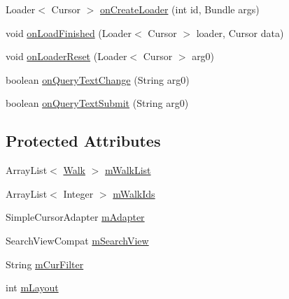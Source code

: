 \begin{DoxyCompactItemize}
\item 
Loader$<$ Cursor $>$ \hyperlink{classuk_1_1ac_1_1swan_1_1digitaltrails_1_1fragments_1_1_walk_list_fragment_aecc878e87887ae603b03326f08f838eb}{on\+Create\+Loader} (int id, Bundle args)
\item 
void \hyperlink{classuk_1_1ac_1_1swan_1_1digitaltrails_1_1fragments_1_1_walk_list_fragment_acecdf60308876436d77d84f87ab34bd2}{on\+Load\+Finished} (Loader$<$ Cursor $>$ loader, Cursor data)
\item 
void \hyperlink{classuk_1_1ac_1_1swan_1_1digitaltrails_1_1fragments_1_1_walk_list_fragment_a5ca7076480000e190fe35179c176120c}{on\+Loader\+Reset} (Loader$<$ Cursor $>$ arg0)
\item 
boolean \hyperlink{classuk_1_1ac_1_1swan_1_1digitaltrails_1_1fragments_1_1_walk_list_fragment_a86b797808137bdb4a3507a4180b1c81e}{on\+Query\+Text\+Change} (String arg0)
\item 
boolean \hyperlink{classuk_1_1ac_1_1swan_1_1digitaltrails_1_1fragments_1_1_walk_list_fragment_a741441f411b49a897294035b2d9f7538}{on\+Query\+Text\+Submit} (String arg0)
\end{DoxyCompactItemize}
\subsection*{Protected Attributes}
\begin{DoxyCompactItemize}
\item 
Array\+List$<$ \hyperlink{classuk_1_1ac_1_1swan_1_1digitaltrails_1_1components_1_1_walk}{Walk} $>$ \hyperlink{classuk_1_1ac_1_1swan_1_1digitaltrails_1_1fragments_1_1_walk_list_fragment_a922fb05349e2afdb386f5ce03fdf6a7e}{m\+Walk\+List}
\item 
Array\+List$<$ Integer $>$ \hyperlink{classuk_1_1ac_1_1swan_1_1digitaltrails_1_1fragments_1_1_walk_list_fragment_ad139fcdf5608a476e92466b389229931}{m\+Walk\+Ids}
\item 
Simple\+Cursor\+Adapter \hyperlink{classuk_1_1ac_1_1swan_1_1digitaltrails_1_1fragments_1_1_walk_list_fragment_aa092b25e6fad559ef03d2f7f0be6f691}{m\+Adapter}
\item 
Search\+View\+Compat \hyperlink{classuk_1_1ac_1_1swan_1_1digitaltrails_1_1fragments_1_1_walk_list_fragment_ae85be36590c4c79cdb464539678ddf72}{m\+Search\+View}
\item 
String \hyperlink{classuk_1_1ac_1_1swan_1_1digitaltrails_1_1fragments_1_1_walk_list_fragment_a5acf4ef61210cc0c2ca02379621e1e75}{m\+Cur\+Filter}
\item 
int \hyperlink{classuk_1_1ac_1_1swan_1_1digitaltrails_1_1fragments_1_1_walk_list_fragment_ab3ae62a7e2ebef8610bf8dcffe8bca1a}{m\+Layout}
\end{DoxyCompactItemize}
